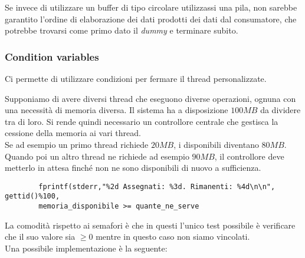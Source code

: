 \begin{observation}
	Se invece di utilizzare un buffer di tipo circolare utilizzassi una pila, non sarebbe garantito l'ordine di elaborazione dei dati prodotti dei dati dal consumatore, che potrebbe trovarsi come primo dato il \emph{dummy} e terminare subito.
\end{observation}

\subsubsection{Condition variables}
Ci permette di utilizzare condizioni per fermare il thread personalizzate.
\begin{example}
	Supponiamo di avere diversi thread che eseguono diverse operazioni, ognuna con una necessità di memoria diversa. Il sistema ha a disposizione $100MB$ da dividere tra di loro. Si rende quindi necessario un controllore centrale che gestisca la cessione della memoria ai vari thread.\\
	Se ad esempio un primo thread richiede $20MB$, i disponibili diventano $80MB$. Quando poi un altro thread ne richiede ad esempio $90MB$, il controllore deve metterlo in attesa finché non ne sono disponibili di nuovo a sufficienza.
	\begin{lstlisting}
		fprintf(stderr,"%2d Assegnati: %3d. Rimanenti: %4d\n\n", gettid()%100,
		memoria_disponibile >= quante_ne_serve
	\end{lstlisting}
\end{example}
La comodità rispetto ai semafori è che in questi l'unico test possibile è verificare che il suo valore sia $\geq 0$ mentre in questo caso non siamo vincolati.\\
Una possibile implementazione è la seguente:
